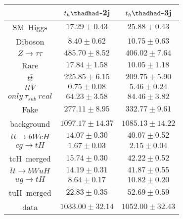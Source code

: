 \centering
\begin{tabular}{ccc}\toprule\toprule
 & $t_{h}\thadhad$-2j                      & $t_{h}\thadhad$-3j \\\midrule
SM~Higgs              & $17.29\pm0.43$                  & $25.88\pm0.43$     \\
Diboson               & $8.40\pm0.62$                    & $10.75\pm0.63$     \\
$Z\to\tau\tau$        & $485.70\pm8.52$           & $406.02\pm7.64$    \\
Rare                  & $17.84\pm1.58$                      & $10.05\pm1.18$     \\
$t\bar{t}$            & $225.85\pm6.15$               & $209.75\pm5.90$    \\
$t\bar{t}V$           & $0.75\pm0.08$                & $5.46\pm0.24$      \\
$only~\tau_{sub}~real$& $64.23\pm3.58$    & $84.46\pm3.82$     \\
Fake                  & $277.11\pm8.95$                     & $332.77\pm9.61$    \\
background            & $1097.17\pm14.37$             & $1085.13\pm14.22$  \\\midrule
$\bar{t}t\to bWcH$ & $14.07\pm0.30$ & $40.07\pm0.52$\\
$cg\to tH$ & $1.67\pm0.03$ & $2.15\pm0.04$\\
tcH~merged & $15.74\pm0.30$ & $42.22\pm0.52$\\
$\bar{t}t\to bWuH$ & $14.19\pm0.31$ & $41.87\pm0.55$\\
$ug\to tH$ & $8.64\pm0.17$ & $10.82\pm0.20$\\
tuH~merged & $22.83\pm0.35$ & $52.69\pm0.59$\\   \midrule
data                  & $1033.00\pm32.14$                   & $1052.00\pm32.43$  \\
\bottomrule\bottomrule
\end{tabular}